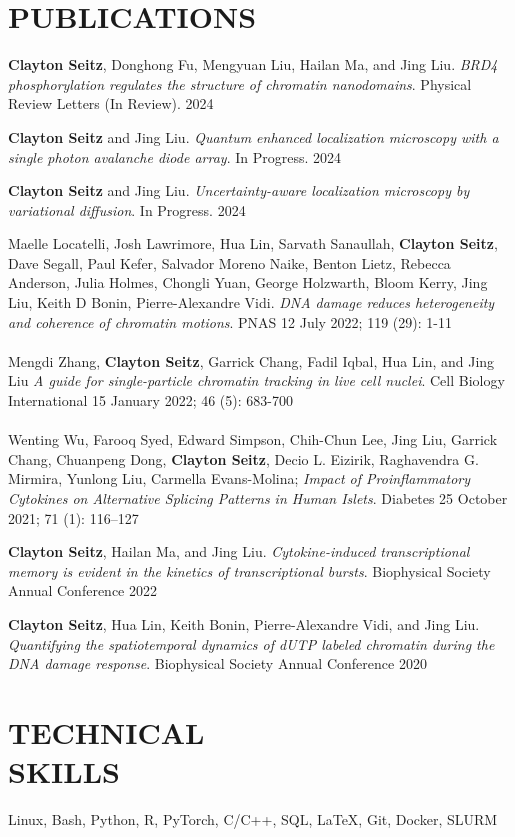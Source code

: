 \documentclass[margin, 10pt]{res} %
\begin{document}
\begin{resume}
\section{PUBLICATIONS}

\textbf{Clayton Seitz}\textsuperscript{\textdagger}, Donghong Fu\textsuperscript{\textdagger}, Mengyuan Liu, Hailan Ma, and Jing Liu. \textit{BRD4 phosphorylation regulates the structure of chromatin nanodomains}. Physical Review Letters (In Review). 2024

\textbf{Clayton Seitz} and Jing Liu. \textit{Quantum enhanced localization microscopy with a single photon avalanche diode array}. In Progress. 2024

\textbf{Clayton Seitz} and Jing Liu. \textit{Uncertainty-aware localization microscopy by variational diffusion}. In Progress. 2024

Maelle Locatelli\textsuperscript{\textdagger}, Josh Lawrimore\textsuperscript{\textdagger}, Hua Lin\textsuperscript{\textdagger}, Sarvath Sanaullah, \textbf{Clayton Seitz}, Dave Segall, Paul Kefer, Salvador Moreno Naike, Benton Lietz, Rebecca Anderson, Julia Holmes, Chongli Yuan, George Holzwarth, Bloom Kerry, Jing Liu, Keith D Bonin, Pierre-Alexandre Vidi. \textit{DNA damage reduces heterogeneity and coherence of chromatin motions}. PNAS 12 July 2022; 119 (29): 1-11
\\
\\
Mengdi Zhang, \textbf{Clayton Seitz}, Garrick Chang, Fadil Iqbal, Hua Lin, and Jing Liu \textit{A guide for single-particle chromatin tracking in live cell nuclei}. Cell Biology International 15 January 2022; 46 (5): 683-700
\\
\\
Wenting Wu, Farooq Syed, Edward Simpson, Chih-Chun Lee, Jing Liu, Garrick Chang, Chuanpeng Dong, \textbf{Clayton Seitz}, Decio L. Eizirik, Raghavendra G. Mirmira, Yunlong Liu, Carmella Evans-Molina; \textit{Impact of Proinflammatory Cytokines on Alternative Splicing Patterns in Human Islets}. Diabetes 25 October 2021; 71 (1): 116–127

\textbf{Clayton Seitz}, Hailan Ma, and Jing Liu. \textit{Cytokine-induced transcriptional memory is evident in the kinetics of transcriptional bursts}. Biophysical Society Annual Conference 2022


\textbf{Clayton Seitz}, Hua Lin, Keith Bonin, Pierre-Alexandre Vidi, and Jing Liu. \textit{Quantifying the spatiotemporal dynamics of dUTP labeled chromatin during the DNA damage response}. Biophysical Society Annual Conference 2020


\section{TECHNICAL \\ SKILLS} 

Linux, Bash, Python, R, PyTorch, C/C++, SQL, LaTeX, Git, Docker, SLURM\\

\end{resume}
\end{document}

